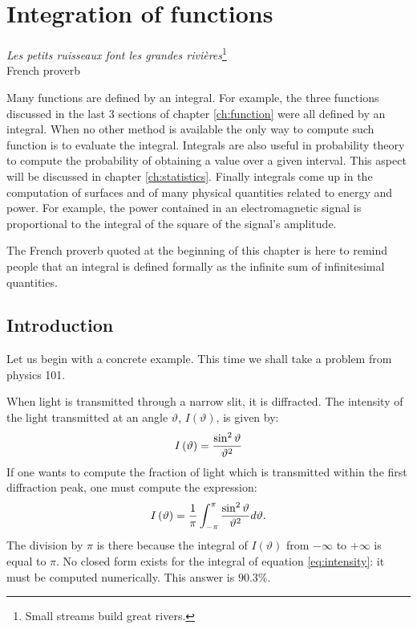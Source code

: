 %
%

\chapter{Integration of functions}
\label{ch:integration}
\begin{flushright}
\textsl{Les petits ruisseaux font les grandes rivi\`{e}res}\footnote{Small streams build great rivers.}\\ French
proverb
\end{flushright}
\vspace{1 ex}Many functions are defined by an integral. For
example, the three functions discussed in the last 3 sections of
chapter \ref{ch:function} were all defined by an integral. When no
other method is available the only way to compute such function is
to evaluate the integral. Integrals are also useful in probability
theory to compute the probability of obtaining a value over a
given interval. This aspect will be discussed in chapter
\ref{ch:statistics}. Finally integrals come up in the computation
of surfaces and of many physical quantities related to energy and
power. For example, the power contained in an electromagnetic
signal is proportional to the integral of the square of the
signal's amplitude.

The French proverb quoted at the beginning of this chapter is here
to remind people that an integral is defined formally as the
infinite sum of infinitesimal quantities.

\section{Introduction}
Let us begin with a concrete example. This time we shall take a
problem from physics 101.

When light is transmitted through a narrow slit, it is diffracted.
The intensity of the light transmitted at an angle $\vartheta$,
$I\left(\vartheta\right)$, is given by:
\begin{equation}
  I\left(\vartheta\right)={\sin^2\vartheta \over \vartheta^2}
\end{equation}
If one wants to compute the fraction of light which is transmitted
within the first diffraction peak, one must compute the
expression:
\begin{equation}
\label{eq:intensity}
  I\left(\vartheta\right)={1 \over\pi}\int_{-\pi}^{\pi}{\sin^2\vartheta \over
  \vartheta^2}d\vartheta.
\end{equation}
The division by $\pi$ is there because the integral of
$I\left(\vartheta\right)$ from $-\infty$ to $+\infty$ is equal to
$\pi$. No closed form exists for the integral of equation
\ref{eq:intensity}: it must be computed numerically. This answer
is $90.3\%$.

